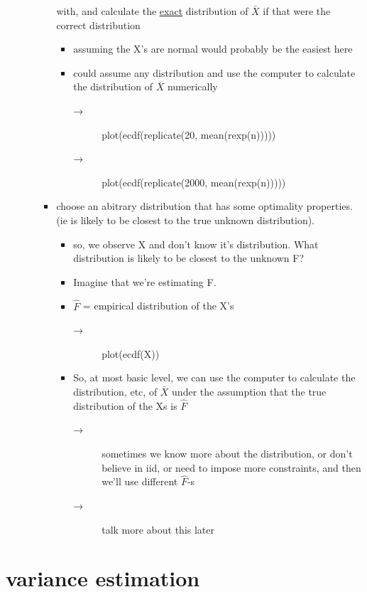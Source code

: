 \begin{itemize}
\begin{itemize}
\begin{itemize}
         with, and calculate the \underline{exact} distribution of $\bar X$ if
         that were the correct distribution
\begin{itemize}
\item assuming the X's are normal would probably be the easiest here
\item could assume any distribution and use the computer to
           calculate the distribution of $\bar X$ numerically
\begin{description}
\item[→] plot(ecdf(replicate(20, mean(rexp(n)))))
\item[→] plot(ecdf(replicate(2000, mean(rexp(n)))))
\end{description}
\end{itemize}
\item choose an abitrary distribution that has some optimality
         properties. (ie is likely to be closest to the true unknown
         distribution).
\begin{itemize}
\item so, we observe X and don't know it's distribution.  What
           distribution is likely to be closest to the unknown F?
\item Imagine that we're estimating F.
\item $\hat F$ = empirical distribution of the X's
\begin{description}
\item[→] plot(ecdf(X))
\end{description}
\item So, at most basic level, we can use the computer to
           calculate the distribution, etc, of $\bar X$ under the
           assumption that the true distribution of the Xs is $\hat F$
\begin{description}
\item[→] sometimes we know more about the distribution, or don't
             believe in iid, or need to impose more constraints, and
             then we'll use different $\hat F$-s
\item[→] talk more about this later
\end{description}
\end{itemize}
\end{itemize}
\end{itemize}
\end{itemize}
\section{variance estimation}
\label{sec-1}

